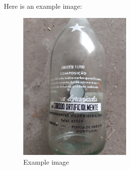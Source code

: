 \documentclass{article}
\begin{document}
Here is an example image:

\begin{figure}[h]
  \centering
  \includegraphics[width=0.5\textwidth]{p2-laranjada.jpg}
  \caption{Example image}
\end{figure}
\end{document}
